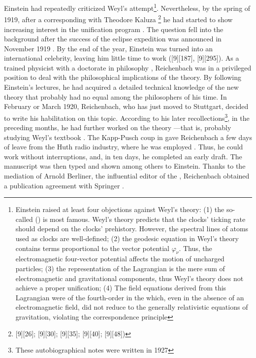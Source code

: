\documentclass[final]{article}
\newcommand{\phin}{\ensuremath{\varphi_\nu}\xspace}
\newcommand{\WT}{Weyl's theory\xspace}
\begin{document}
Einstein had repeatedly criticized Weyl's attempt\footnote{Einstein raised at least four objections against Weyl's theory: (1) the so-called  () \citep{Einstein1918b} is most famous. \WT predicts that the clocks' ticking rate should depend on the clocks' prehistory. However, the spectral lines of atoms used as clocks are well-defined; (2) the geodesic equation in Weyl's theory con­tains terms proportional to the vector potential \phin. Thus, the electromagnetic four-vector potential affects the motion of uncharged particles; (3) the representation of the Lagrangian is the mere sum of electromagnetic and gravitational components, thus \WT does not achieve a proper unification; (4) The field equations derived from this Lagrangian were of the fourth-order in the \gmn which, even in the absence of an electromagnetic field, did not reduce to the generally relativistic equations of gravitation, violating the correspondence principle}. Nevertheless, by the spring of 1919, after a corresponding with Theodore Kaluza \citep{Wuensch2005}\footnote{[9][26]; [9][30]; [9][35]; [9][40]; [9][48])} he had started to show increasing interest in the unification program \citep{Einstein1919a}. The question fell into the background after the success of the eclipse expedition was announced in November 1919 \citep{Dyson1920}. By the end of the year, Einstein was turned into an international celebrity, leaving him little time to work ([9][187], [9][295]). As a trained physicist with a doctorate in philosophy \citep{Reichenbach1916}, Reichenbach was in a privileged position to deal with the philosophical implications of the theory. By following Einstein's lectures, he had acquired a detailed technical knowledge of the new theory that probably had no equal among the philosophers of his time. In February or March 1920, Reichenbach, who has just moved to Stuttgart, decided to write his habilitation on this topic. According to his later recollections\footnote{These autobiographical notes \cite[044-06-23]{HR} were written in 1927}, in the preceding months, he had further worked on the theory  \citep[044-06-23]{HR}---that is, probably studying Weyl's textbook  \citep{Weyl1918}. The Kapp-Pusch coup in  gave Reichenbach a few days of leave from the Huth radio industry, where he was employed \citep[044-06-23]{HR}. Thus, he could work without interruptions, and, in ten days, he completed an early draft. The manuscript was then typed and shown among others to Einstein. Thanks to the mediation of Arnold Berliner, the influential editor of the , Reichenbach obtained a publication agreement with Springer \citep[044-06-23]{HR}.
\end{document}
